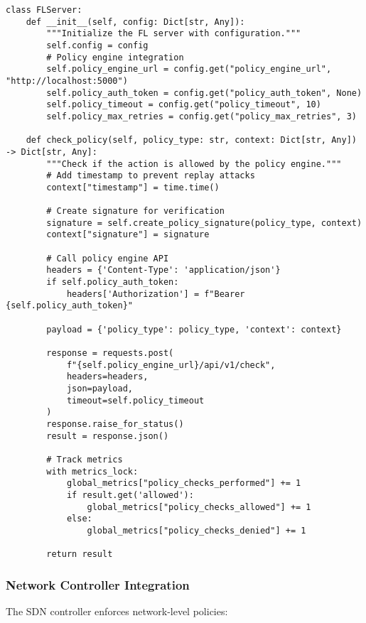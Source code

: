 \begin{lstlisting}[style=pythoncode, caption=FL Server Policy Integration]
class FLServer:
    def __init__(self, config: Dict[str, Any]):
        """Initialize the FL server with configuration."""
        self.config = config
        # Policy engine integration
        self.policy_engine_url = config.get("policy_engine_url", "http://localhost:5000")
        self.policy_auth_token = config.get("policy_auth_token", None)
        self.policy_timeout = config.get("policy_timeout", 10)
        self.policy_max_retries = config.get("policy_max_retries", 3)
    
    def check_policy(self, policy_type: str, context: Dict[str, Any]) -> Dict[str, Any]:
        """Check if the action is allowed by the policy engine."""
        # Add timestamp to prevent replay attacks
        context["timestamp"] = time.time()
        
        # Create signature for verification
        signature = self.create_policy_signature(policy_type, context)
        context["signature"] = signature
        
        # Call policy engine API
        headers = {'Content-Type': 'application/json'}
        if self.policy_auth_token:
            headers['Authorization'] = f"Bearer {self.policy_auth_token}"
            
        payload = {'policy_type': policy_type, 'context': context}
        
        response = requests.post(
            f"{self.policy_engine_url}/api/v1/check",
            headers=headers,
            json=payload,
            timeout=self.policy_timeout
        )
        response.raise_for_status()
        result = response.json()
        
        # Track metrics
        with metrics_lock:
            global_metrics["policy_checks_performed"] += 1
            if result.get('allowed'):
                global_metrics["policy_checks_allowed"] += 1
            else:
                global_metrics["policy_checks_denied"] += 1
        
        return result
\end{lstlisting}

\subsubsection{Network Controller Integration}

The SDN controller enforces network-level policies:

